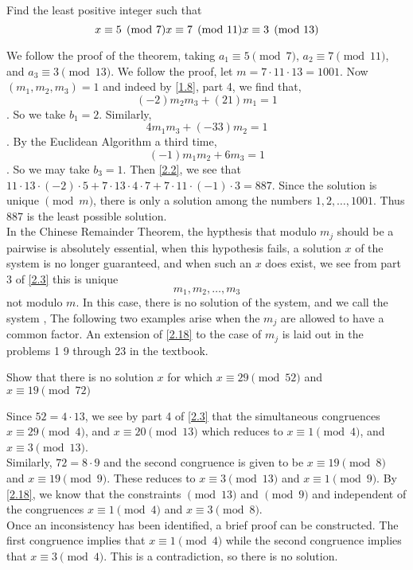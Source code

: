 \documentclass[11pt]{article}
\begin{document}
\begin{example}
	Find the least positive integer such that
	\[x \equiv 5 \pmod{7} \\ x \equiv 7 \pmod{11} \\ x \equiv 3 \pmod{13}\]
\end{example}
\begin{solution}
	We follow the proof of the theorem, taking \(a_1 \equiv 5 \pmod{7}\), \(a_2 \equiv 7 \pmod{11}\), and \(a_3 \equiv 3 \pmod{13}\). We follow the proof, let \(m = 7 \cdot 11 \cdot 13 = 1001\). Now \((m_1, m_2, m_3) = 1\) and indeed by \cref{1.8}, part 4, we find that, \[(-2) m_2 m_3 + (21)m_1 = 1\]. So we take \(b_1 = 2\). Similarly, \[4m_1 m_3 + (-33)m_2 = 1\]. By the Euclidean Algorithm a third time, \[(-1)m_1 m_2 + 6m_3 = 1\]. So we may take \(b_3 =1\). Then \cref{2.2}, we see that \(11 \cdot 13 \cdot (-2) \cdot 5 + 7 \cdot 13 \cdot 4 \cdot 7 + 7 \cdot 11 \cdot (-1) \cdot 3 = 887\). Since the solution is unique \(\pmod {m}\), there is only a solution among the numbers \(1, 2, \ldots, 1001\). Thus 887 is the least possible solution. \\ In the Chinese Remainder Theorem, the hypthesis that modulo \(m_j\) should be a pairwise is absolutely essential, when this hypothesis fails, a solution \(x\) of the system is no longer guaranteed, and when such an \(x\) does exist, we see from part 3 of \cref{2.3} this is unique \[m_1, m_2, \ldots, m_3\] not modulo \(m\). In this case, there is no solution of the system, and we call
	the system , The following two examples arise when the
	\(m_j\) are allowed to have a common factor. An extension of \cref{2.18} to the
	case of \(m_j\) is laid out in the problems 1 9 through 23 in the textbook.
\end{solution}

\begin{example}
	Show that there is no solution \(x\) for which \(x \equiv 29 \pmod{52}\) and \(x\equiv 19 \pmod{72}\)
\end{example}
\begin{solution}
	Since \(52 = 4 \cdot 13\), we see by part 4 of \cref{2.3} that the simultaneous congruences \(x \equiv 29 \pmod{4}\), and \(x \equiv 20 \pmod{13}\) which reduces to \(x \equiv 1 \pmod{4}\), and \(x \equiv 3 \pmod{13}\). \\ Similarly, \(72 = 8 \cdot 9\) and the second congruence is given to be \(x \equiv 19 \pmod{8}\) and \(x \equiv 19 \pmod{9}\). These reduces to \(x \equiv 3 \pmod{13}\) and \(x \equiv 1 \pmod{9}\). By \cref{2.18}, we know that the constraints \(\pmod{13}\) and \(\pmod{9}\) and independent of the congruences \(x \equiv 1 \pmod{4}\) and \(x \equiv 3 \pmod{8}\). \\ Once an inconsistency has been identified, a brief proof can be constructed. The first congruence implies that \(x \equiv 1 \pmod{4}\) while the second congruence implies that \(x \equiv 3 \pmod{4}\). This is a contradiction, so there is no solution.
\end{solution}
\end{document}
